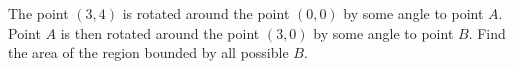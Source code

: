 The point $(3,4)$ is rotated around the point $(0,0)$ by some angle to point $A$. Point $A$ is then rotated around the point $(3,0)$ by some angle to point $B$. Find the area of the region bounded by all possible $B$.
